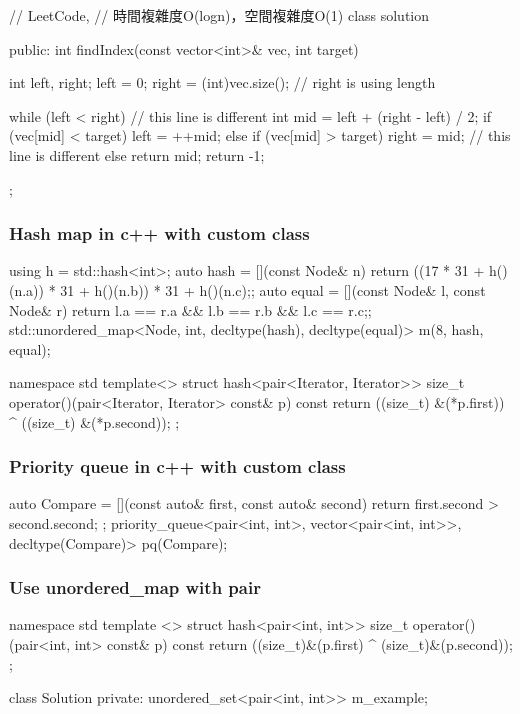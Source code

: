 \begin{Code}
// LeetCode, 
// 時間複雜度O(logn)，空間複雜度O(1)
class solution{
public:
    int findIndex(const vector<int>& vec, int target) {
        int left, right;
        left = 0; right = (int)vec.size(); // right is using length 
        
        while (left < right) { // this line is different
            int mid = left + (right - left) / 2;
            if (vec[mid] < target)
                left = ++mid;
            else if (vec[mid] > target)
                right = mid; // this line is different
            else
                return mid;
        }
        return -1;
    }
};
\end{Code}

\subsubsection{Hash map in c++ with custom class}

\begin{Code}
using h = std::hash<int>;
auto hash = [](const Node& n)
              {return ((17 * 31 + h()(n.a)) * 31 + h()(n.b)) * 31 + h()(n.c);};
auto equal = [](const Node& l, const Node& r)
               {return l.a == r.a && l.b == r.b && l.c == r.c;};
std::unordered_map<Node, int, decltype(hash), decltype(equal)> m(8, hash, equal);
\end{Code}

\begin{Code}
namespace std {
template<>
struct hash<pair<Iterator, Iterator>> {
    size_t operator()(pair<Iterator, Iterator> const& p) const {
        return ((size_t) &(*p.first)) ^ ((size_t) &(*p.second));
    }
};
}
\end{Code}

\subsubsection{Priority queue in c++ with custom class}

\begin{Code}
auto Compare = [](const auto& first, const auto& second)
                  { return first.second > second.second; };
priority_queue<pair<int, int>, vector<pair<int, int>>, decltype(Compare)>
                  pq(Compare);
\end{Code}

\subsubsection{Use unordered_map with pair}

\begin{Code}
namespace std
{
    template <>
        struct hash<pair<int, int>>
        {
            size_t operator()(pair<int, int> const& p) const
            {
                return ((size_t)&(p.first) ^ (size_t)&(p.second));
            }
        };
}

class Solution {
private:
    unordered_set<pair<int, int>> m_example;
}
\end{Code}